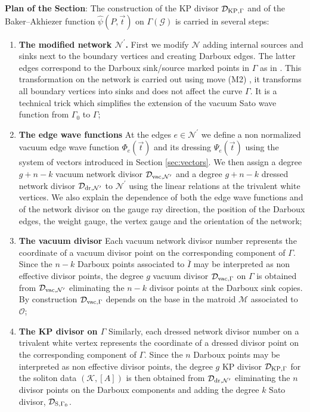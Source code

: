 \documentclass[11pt]{amsart}
\theoremstyle{plain}
\numberwithin{equation}{section}
\def \DKP {{\mathcal D}_{\textup{\scriptsize KP},\Gamma}}
\def \DS {{\mathcal D}_{\textup{\scriptsize S},\Gamma_0}}
\def \DVN {{\mathcal D}_{\textup{\scriptsize vac},{\mathcal N}^{\prime}}}
\def \DDN {{\mathcal D}_{\textup{\scriptsize dr},{\mathcal N}^{\prime}}}
\begin{document}
\textbf{Plan of the Section}: The construction of the KP divisor $\DKP$ and of the Baker--Akhiezer function $\hat \psi(P, \vec t)$ on $\Gamma(\mathcal G)$ is carried in several steps:
\begin{enumerate}
\item\textbf{The modified network ${\mathcal N}^{\prime}$.} First we modify $\mathcal N$ adding internal sources and sinks next to the boundary vertices and creating Darboux edges. The latter edges correspond to 
the Darboux sink/source marked points in $\Gamma$ as in \cite{AG1,AG2}. This transformation on the network is carried out using move (M2) \cite{Pos}, it transforms all boundary vertices into sinks and does not affect the curve $\Gamma$. It is a technical trick which simplifies the extension of the vacuum Sato wave function from $\Gamma_0$ to $\Gamma$;
\item\textbf{The edge wave functions} At the edges $e\in {\mathcal N}^{\prime}$ we define a non normalized vacuum edge wave function $\Phi_e (\vec t)$ and its dressing $\Psi_e (\vec t)$ using the system of vectors introduced in Section \ref{sec:vectors}. We then assign a degree $g+n-k$ vacuum network divisor $\DVN$ and a degree $g+n-k$ dressed network divisor $\DDN$ to ${\mathcal N}^{\prime}$ using the linear relations at the trivalent white vertices. 
We also explain the dependence of both the edge wave functions and of the network divisor on the gauge ray direction, the position of the Darboux edges, the weight gauge, the vertex gauge and the orientation of the network; 
\item\textbf{The vacuum divisor} Each vacuum network divisor number represents the coordinate of a vacuum divisor point on the corresponding component of $\Gamma$. Since the $n-k$ Darboux points associated to $\bar I$ may be interpreted as non effective divisor points, the degree $g$ vacuum divisor ${\mathcal D}_{\textup{\scriptsize vac},\Gamma}$ on $\Gamma$ is obtained from $\DVN$ eliminating the $n-k$ divisor points at the Darboux sink copies. By construction ${\mathcal D}_{\textup{\scriptsize vac},\Gamma}$ depends on the base in the matroid $\mathcal M$ associated to $\mathcal O$;
\item\textbf{The KP divisor on $\Gamma$} Similarly, each dressed network divisor number on a trivalent white vertex represents the coordinate of a dressed divisor point on the corresponding component of $\Gamma$. Since the $n$ Darboux points may be interpreted as non effective divisor points, the degree $g$ KP divisor $\DKP$ for the soliton data $(\mathcal K, [A])$ is then obtained from $\DDN$ eliminating the $n$ divisor points on the Darboux components and adding the degree $k$ Sato divisor, $\DS$.

\end{enumerate}
\end{document}
